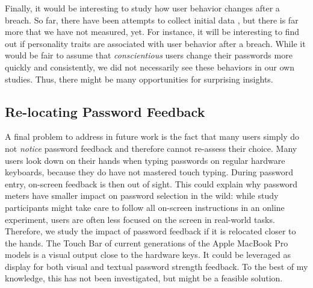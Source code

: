 Finally, it would be interesting to study how user behavior changes after a breach. So far, there have been attempts to collect initial data \cite{Huh2017TooBusy}, but there is far more that we have not measured, yet. For instance, it will be interesting to find out if personality traits are associated with user behavior after a breach. While it would be fair to assume that \textit{conscientious} users change their passwords more quickly and consistently, we did not necessarily see these behaviors in our own studies. Thus, there might be many opportunities for surprising insights.

\subsection{Re-locating Password Feedback} 
A final problem to address in future work is the fact that many users simply do not \textit{notice} password feedback and therefore cannot re-assess their choice. 
Many users look down on their hands when typing passwords on regular hardware keyboards, because they do have not mastered touch typing. During password entry, on-screen feedback is then out of sight. 
This could explain why password meters have smaller impact on password selection in the wild: while study participants might take care to follow all on-screen instructions in an online experiment, users are often less focused on the screen in real-world tasks. 
Therefore, we study the impact of password feedback if it is relocated closer to the hands. 
The Touch Bar of current generations of the Apple MacBook Pro models is a visual output close to the hardware keys. It could be leveraged as display for both visual and textual password strength feedback. 
To the best of my knowledge, this has not been investigated, but might be a feasible solution. 



